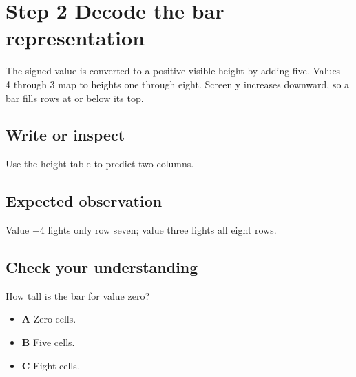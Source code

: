 \section{Step 2 Decode the bar
  representation}\label{009-sorting-visualizer-s02-step-2-decode-the-bar-representation}

The signed value is converted to a positive visible height by adding
five. Values \ensuremath{-}4 through 3 map to heights one through eight. Screen y
increases downward, so a bar fills rows at or below its top.

\subsection{Write or
  inspect}\label{009-sorting-visualizer-s02-write-or-inspect}

Use the height table to predict two columns.

\subsection{Expected
  observation}\label{009-sorting-visualizer-s02-expected-observation}

Value \ensuremath{-}4 lights only row seven; value three lights all eight rows.

\subsection{Check your
  understanding}\label{009-sorting-visualizer-s02-check-your-understanding}

How tall is the bar for value zero?

\begin{itemize}
  \tightlist
  \item
        \textbf{A} Zero cells.
  \item
        \textbf{B} Five cells.
  \item
        \textbf{C} Eight cells.
\end{itemize}
